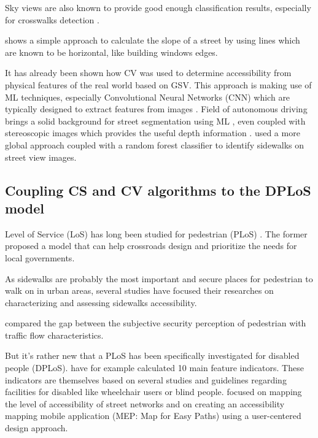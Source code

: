 \documentclass[10pt,conference,a4paper]{IEEEtran}
\begin{document}
Sky views are also known to provide good enough classification results, especially for crosswalks detection \cite{berriel_deep_2017}.

\cite{lu_real-time_2015} shows a simple approach to calculate the slope of a street by using lines which are known to be horizontal, like building windows edges.

It has already been shown \cite{hara_tohme:_2014, hara_design_2016} how CV was used to determine accessibility from physical features of the real world based on GSV. This approach is making use of ML techniques, especially Convolutional Neural Networks (CNN) which are typically designed to extract features from images \cite{lecun1995convolutional}. Field of autonomous driving brings a solid background for street segmentation using ML \cite{alvarez2012road}, even coupled with stereoscopic images which provides the useful depth information \cite{coughlan_terrain_2007,zbontar2016stereo}.
\cite{smith_classification_2013} used a more global approach coupled with a random forest classifier to identify sidewalks on street view images.




\subsection{Coupling CS and CV algorithms to the DPLoS model}
Level of Service (LoS) has long been studied for pedestrian (PLoS) \cite{landis_modeling_2001, gallin_quantifying_2001}. The former proposed a model that can help crossroads design and prioritize the needs for local governments. 

As sidewalks are probably the most important and secure places for pedestrian to walk on in urban areas, several studies have focused their researches on characterizing and assessing sidewalks accessibility.

\cite{tan_research_2007} compared the gap between the subjective security perception of pedestrian with traffic flow characteristics.

But it's rather new that a PLoS has been specifically investigated for disabled people (DPLoS). \cite{asadi-shekari_zohreh_disabled_2013} have for example calculated 10 main feature indicators. These indicators are themselves based on several studies and guidelines regarding facilities for disabled like wheelchair users or blind people. 
\cite{mostafavi2015mobilisig, gharebaghi2017confidence} focused on mapping the level of accessibility of street networks and \cite{liu_crowdsourcing-based_2017, comai_mapping_2015} on creating an accessibility mapping mobile application (MEP: Map for Easy Paths) using a user-centered design approach. 
\end{document}
